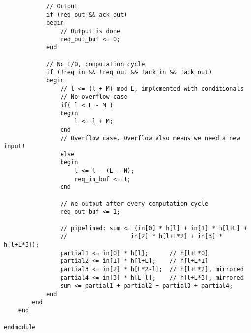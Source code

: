 \begin{verbatim}
            // Output
            if (req_out && ack_out)
            begin
                // Output is done
                req_out_buf <= 0;
            end

            // No I/O, computation cycle
            if (!req_in && !req_out && !ack_in && !ack_out)
            begin
                // l <= (l + M) mod L, implemented with conditionals
                // No-overflow case
                if( l < L - M )
                begin
                    l <= l + M;
                end
                // Overflow case. Overflow also means we need a new input!
                else
                begin
                    l <= l - (L - M);
                    req_in_buf <= 1;
                end

                // We output after every computation cycle
                req_out_buf <= 1;

                // pipelined: sum <= (in[0] * h[l] + in[1] * h[l+L] + 
                //                  in[2] * h[l+L*2] + in[3] * h[l+L*3]);
                partial1 <= in[0] * h[l];      // h[l+L*0]
                partial2 <= in[1] * h[l+L];    // h[l+L*1]
                partial3 <= in[2] * h[L*2-l];  // h[l+L*2], mirrored
                partial4 <= in[3] * h[L-l];    // h[l+L*3], mirrored
                sum <= partial1 + partial2 + partial3 + partial4;
            end
        end
    end

endmodule

\end{verbatim}

